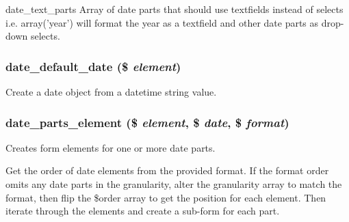 date\_\-text\_\-parts Array of date parts that should use textfields instead of selects i.e. array('year') will format the year as a textfield and other date parts as drop-\/down selects. \hypertarget{date__api__elements_8inc_af1a4c11c288aec82c194eb7393932ee3}{
\subsubsection[{date\_\-default\_\-date}]{\setlength{\rightskip}{0pt plus 5cm}date\_\-default\_\-date (\$ {\em element})}}
\label{date__api__elements_8inc_af1a4c11c288aec82c194eb7393932ee3}
Create a date object from a datetime string value. \hypertarget{date__api__elements_8inc_a9d8d4e7d43727fc350dd30c42fc5fc10}{
\subsubsection[{date\_\-parts\_\-element}]{\setlength{\rightskip}{0pt plus 5cm}date\_\-parts\_\-element (\$ {\em element}, \/  \$ {\em date}, \/  \$ {\em format})}}
\label{date__api__elements_8inc_a9d8d4e7d43727fc350dd30c42fc5fc10}
Creates form elements for one or more date parts.

Get the order of date elements from the provided format. If the format order omits any date parts in the granularity, alter the granularity array to match the format, then flip the \$order array to get the position for each element. Then iterate through the elements and create a sub-\/form for each part.


